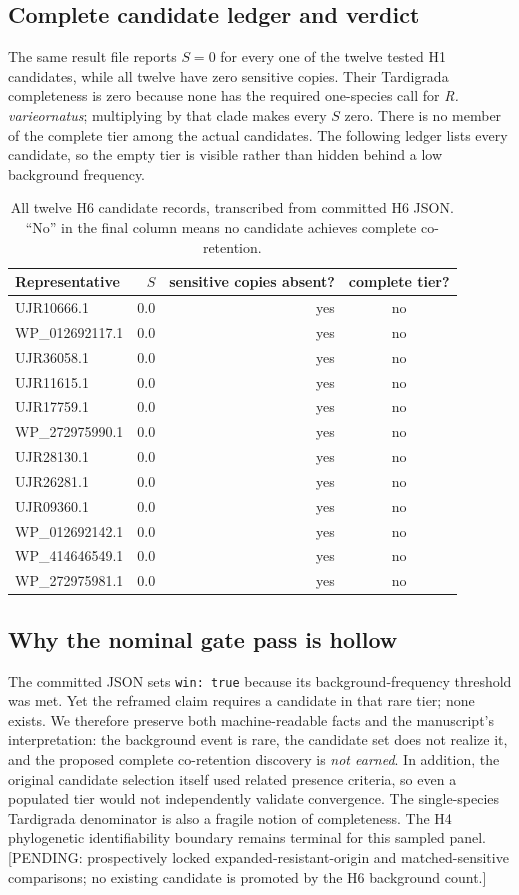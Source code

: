 \subsection{Complete candidate ledger and verdict}
The same result file reports $S=0$ for every one of the twelve tested H1 candidates, while all twelve have zero sensitive copies. Their Tardigrada completeness is zero because none has the required one-species call for \emph{R. varieornatus}; multiplying by that clade makes every $S$ zero. There is no member of the complete tier among the actual candidates. The following ledger lists every candidate, so the empty tier is visible rather than hidden behind a low background frequency.\begin{table}[!htbp]\centering\small\caption{All twelve H6 candidate records, transcribed from committed H6 JSON. ``No'' in the final column means no candidate achieves complete co-retention.}\begin{tabular}{lrrc}\hline Representative & $S$ & sensitive copies absent? & complete tier? \\\hline
UJR10666.1 & 0.0 & yes & no\\
WP\_012692117.1 & 0.0 & yes & no\\
UJR36058.1 & 0.0 & yes & no\\
UJR11615.1 & 0.0 & yes & no\\
UJR17759.1 & 0.0 & yes & no\\
WP\_272975990.1 & 0.0 & yes & no\\
UJR28130.1 & 0.0 & yes & no\\
UJR26281.1 & 0.0 & yes & no\\
UJR09360.1 & 0.0 & yes & no\\
WP\_012692142.1 & 0.0 & yes & no\\
WP\_414646549.1 & 0.0 & yes & no\\
WP\_272975981.1 & 0.0 & yes & no\\
\hline\end{tabular}\end{table}
\subsection{Why the nominal gate pass is hollow}
The committed JSON sets \texttt{win: true} because its background-frequency threshold was met. Yet the reframed claim requires a candidate in that rare tier; none exists. We therefore preserve both machine-readable facts and the manuscript's interpretation: the background event is rare, the candidate set does not realize it, and the proposed complete co-retention discovery is \emph{not earned}. In addition, the original candidate selection itself used related presence criteria, so even a populated tier would not independently validate convergence. The single-species Tardigrada denominator is also a fragile notion of completeness. The H4 phylogenetic identifiability boundary remains terminal for this sampled panel. [PENDING: prospectively locked expanded-resistant-origin and matched-sensitive comparisons; no existing candidate is promoted by the H6 background count.]

